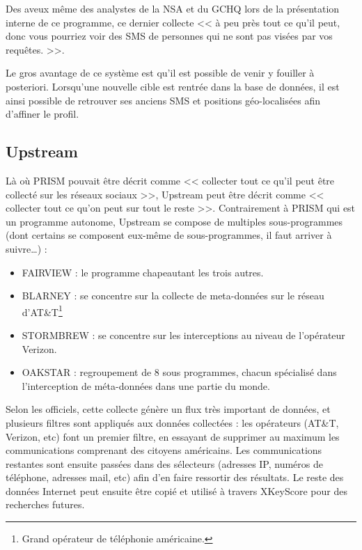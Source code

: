 Des aveux même des analystes de la NSA et du GCHQ lors de la
présentation interne de ce programme, ce dernier collecte << à peu près tout ce
qu'il peut, donc vous pourriez voir des SMS de personnes qui ne sont pas visées
par vos requêtes. >>\citep{Guardian}.\newline

Le gros avantage de ce système est qu'il est possible de venir y
fouiller à posteriori. Lorsqu'une nouvelle cible est rentrée dans la base de
données, il est ainsi possible de retrouver ses anciens SMS et positions
géo-localisées afin d'affiner le profil.

\subsection{Upstream}

Là où PRISM pouvait être décrit comme << collecter tout ce qu'il
peut être collecté sur les réseaux sociaux >>, Upstream peut être décrit comme
<< collecter tout ce qu'on peut sur tout le reste >>. Contrairement à PRISM qui
est un programme autonome, Upstream se compose de multiples sous-programmes
(dont certains se composent eux-même de sous-programmes, il faut arriver à
suivre\ldots) :\newline

\begin{itemize}
  \item FAIRVIEW : le programme chapeautant les trois autres.
  \item BLARNEY : se concentre sur la collecte de meta-données sur le réseau
  d'AT\&T\footnote{Grand opérateur de téléphonie américaine.}
  \item STORMBREW : se concentre sur les interceptions au niveau de l'opérateur
  Verizon.
  \item OAKSTAR : regroupement de 8 sous programmes, chacun spécialisé dans
  l'interception de méta-données dans une partie du monde.\newline
\end{itemize}

Selon les officiels, cette collecte génère un flux très important
de données, et plusieurs filtres sont appliqués aux données collectées : les
opérateurs (AT\&T, Verizon, etc) font un premier filtre, en essayant de
supprimer au maximum les communications comprenant des citoyens américains.
Les communications restantes sont ensuite passées dans des sélecteurs (adresses
IP, numéros de téléphone, adresses mail, etc) afin d'en faire ressortir des
résultats. Le reste des données Internet peut ensuite être copié et utilisé à
travers XKeyScore pour des recherches futures.\newline

